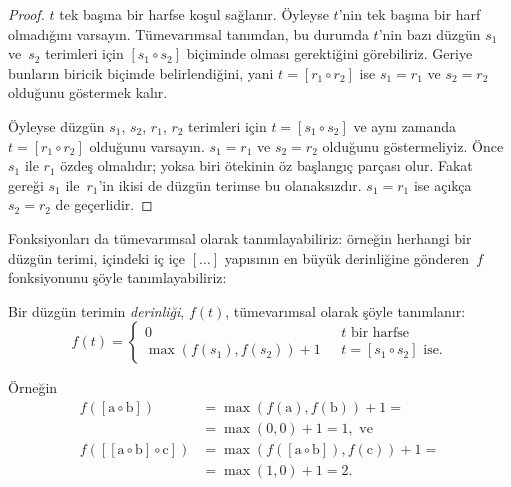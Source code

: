 \documentclass[../../../include/open-logic-section]{subfiles}
\begin{document}
\begin{proof}
  $t$ tek başına bir harfse koşul sağlanır. Öyleyse $t$'nin tek başına
  bir harf olmadığını varsayın. Tümevarımsal tanımdan, bu durumda
  $t$'nin bazı düzgün $s_1$ ve~$s_2$ terimleri için $[s_1 \circ s_2]$
  biçiminde olması gerektiğini görebiliriz. Geriye bunların biricik biçimde
  belirlendiğini, yani $t = [r_1 \circ r_2]$ ise $s_1 = r_1$ ve $s_2 =
  r_2$ olduğunu göstermek kalır.

  Öyleyse düzgün $s_1$, $s_2$, $r_1$, $r_2$ terimleri için $t = [s_1
  \circ s_2]$ ve aynı zamanda $t = [r_1 \circ r_2]$ olduğunu varsayın.
  $s_1 = r_1$ ve $s_2 = r_2$ olduğunu göstermeliyiz. Önce $s_1$ ile
  $r_1$ özdeş olmalıdır; yoksa biri ötekinin öz başlangıç parçası olur.
  Fakat  gereği $s_1$ ile~$r_1$'in ikisi de
  düzgün terimse bu olanaksızdır. $s_1 = r_1$ ise açıkça $s_2 = r_2$ de
  geçerlidir.
\end{proof}

Fonksiyonları da tümevarımsal olarak tanımlayabiliriz: örneğin herhangi
bir düzgün terimi, içindeki iç içe $[\dots]$ yapısının en büyük
derinliğine gönderen~$f$ fonksiyonunu şöyle tanımlayabiliriz:

\begin{defn}
   Bir düzgün terimin \emph{derinliği}, $f(t)$,
  tümevarımsal olarak şöyle tanımlanır:
  \[
  f(t) = \begin{cases}
    0 & \text{ $t$ bir harfse}\\
    \max(f(s_1), f(s_2)) + 1 & \text{ $t = [s_1 \circ s_2]$ ise.}
  \end{cases}
  \]
\end{defn}

Örneğin
\begin{align*}
  f([\mathrm{a} \circ \mathrm{b}]) & =
    \max(f(\mathrm{a}),f(\mathrm{b})) + 1 = \\
  &= \max(0, 0) + 1 = 1, \text{ ve}\\
  f([[\mathrm{a} \circ \mathrm{b}] \circ \mathrm{c}]) & =
    \max(f([\mathrm{a} \circ \mathrm{b}]), f(\mathrm{c})) + 1 = \\
  & = \max(1,0) + 1 = 2.
\end{align*}
\end{document}
